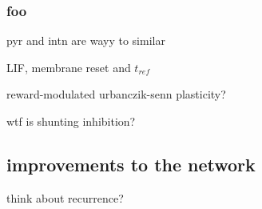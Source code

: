 \subsubsection{foo}


pyr and intn are wayy to similar

LIF, membrane reset and $t_{ref}$

reward-modulated urbanczik-senn plasticity?

wtf is shunting inhibition?



\subsection{improvements to the network}

think about recurrence?

